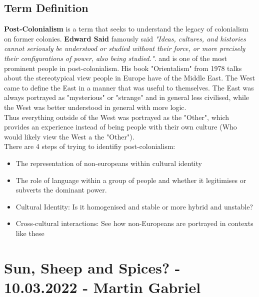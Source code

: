\documentclass{article}
\begin{document}
	\subsection{Term Definition}
	\textbf{Post-Colonialism} is a term that seeks to understand the legacy of colonialism on former colonies. \textbf{Edward Said} famously said \textit{"Ideas, cultures, and histories cannot seriously be understood or studied without their force, or more precisely their configurations of power, also being studied."}. and is one of the most prominent people in post-colonialism. His book "Orientalism" from 1978 talks about the stereotypical view people in Europe have of the Middle East. The West came to define the East in a manner that was useful to themselves. The East was always portrayed as "mysterious" or "strange" and in general less civilised, while the West was better understood in general with more logic. \\
	Thus everything outside of the West was portrayed as the "Other", which provides an experience instead of being people with their own culture (Who would likely view the West a the "Other"). \\
	There are 4 steps of trying to identifiy post-colonialism:
	\begin{itemize}
		\item{The representation of non-europeans within cultural identity}
		\item{The role of language within a group of people and whether it legitimises or subverts the dominant power.}
		\item{Cultural Identity: Is it homogenised and stable or more hybrid and unstable?}
		\item{Cross-cultural interactions: See how non-Europeans are portrayed in contexts like these}
	\end{itemize}

	\section{Sun, Sheep and Spices? - 10.03.2022 - Martin Gabriel}
\end{document}
